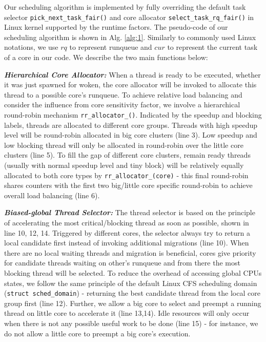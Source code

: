 \documentclass{sig-alternate}
\begin{document}
Our scheduling algorithm is implemented by fully overriding the default task selector \texttt{pick\_next\_task\_fair()} and core allocator \texttt{select\_task\_rq\_fair()} in Linux kernel supported by the runtime factors. The pseudo-code of our scheduling algorithm is shown in Alg. \ref{alg:1}. 
Similarly to commonly used Linux notations, we use $rq$ to represent runqueue and $cur$ to represent the current task of a core in our code. We describe the two main functions below:

\textbf{\textit{Hierarchical Core Allocator:}}
When a thread is ready to be executed, whether it was just spawned for woken, the core allocator will be invoked to allocate this thread to a possible core's runqueue. To achieve relative load balancing and consider the influence from core sensitivity factor, we involve a hierarchical round-robin mechanism \texttt{rr\_allocator\_()}. Indicated by the speedup and blocking labels, threads are allocated to different core groups. Threads with high speedup level will be round-robin allocated in big core clusters (line 3). Low speedup and low blocking thread will only be allocated in round-robin over the little core clusters (line 5). 
To fill the gap of different core clusters, remain ready threads (usually with normal speedup level and tiny block) will be relatively equally allocated to both core types by \texttt{rr\_allocator\_(core)} - this final round-robin shares counters with the first two big/little core specific round-robin to achieve overall load balancing (line 6).  

\textbf{\textit{Biased-global Thread Selector:}}
The thread selector is based on the principle of accelerating the most critical/blocking thread as soon as possible, shown in line 10, 12, 14. Triggered by different cores, the selector always try to return  a local candidate first instead of invoking additional migrations (line 10). When there are no local waiting threads and migration is beneficial, cores give priority for candidate threads waiting on other's runqueue and from there the most blocking thread will be selected.
To reduce the overhead of accessing global CPUs states, we follow the same principle of the default Linux CFS scheduling domain (\texttt{struct sched\_domain}) - returning the best candidate thread from the local core group first (line 12).
Further, we allow a big core to select and preempt a running thread on little core to accelerate it (line 13,14). Idle resources will only occur when there is not any possible useful work to be done (line 15) - for instance, we do not allow a little core to preempt a big core's execution. 
\end{document}
